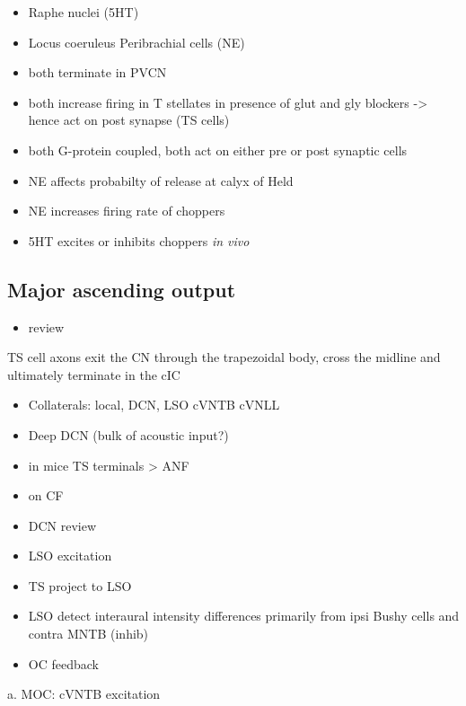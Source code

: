 \begin{itemize}
\item Raphe nuclei (5HT)
\item Locus coeruleus Peribrachial cells (NE)
\item both terminate in PVCN \citep{KlepperHerbert:1991,Thompson:2003,ThompsonLauder:2005,Thompson:2003a,ThompsonWiechmann:2002,BehrensSchofieldEtAl:2002,ThompsonThompson:2001,ThompsonThompson:2001a,ThompsonMooreEtAl:1995,ThompsonThompsonEtAl:1994}
\item both increase firing in T stellates \citep{OertelWrightEtAl:2010} in presence of glut and gly blockers -> hence act on post synapse (TS cells)
\item both G-protein coupled, both act on either pre or post synaptic cells
\item NE affects probabilty of release at calyx of Held
\item NE increases firing rate of choppers \citep{KosslVater:1989,Ebert:1996}
\item 5HT excites or inhibits choppers \emph{in vivo} \citep{EbertOstwald:1992}
\end{itemize}
\subsection{Major ascending output}
\label{sec-1_6}


\begin{itemize}
\item review \citep{DoucetRyugo:2006}
\end{itemize}

TS cell axons exit the CN through the trapezoidal body, cross the midline and ultimately terminate in the cIC \citep{Adams:1979}


\begin{itemize}
\item Collaterals: local, DCN, LSO cVNTB cVNLL \citep{Warr:1969,SmithJorisEtAl:1993,Thompson:1998,DoucetRyugo:2003}
\item Deep DCN (bulk of acoustic input?)
\item in mice TS terminals > ANF \citep{CaoMcGinleyEtAl:2008}
\item on CF \citep{SmithRhode:1989,FriedlandPongstapornEtAl:2003,DoucetRyugo:1997}
\item DCN review \citep{OertelYoung:2004}
\item LSO excitation
\item TS project to LSO \citep{Thompson:1998,DoucetRyugo:2003,ThompsonThompson:1991a}
\item LSO detect interaural intensity differences primarily from ipsi Bushy cells and contra MNTB (inhib)
\item OC feedback
\end{itemize}
a. MOC: cVNTB excitation 

